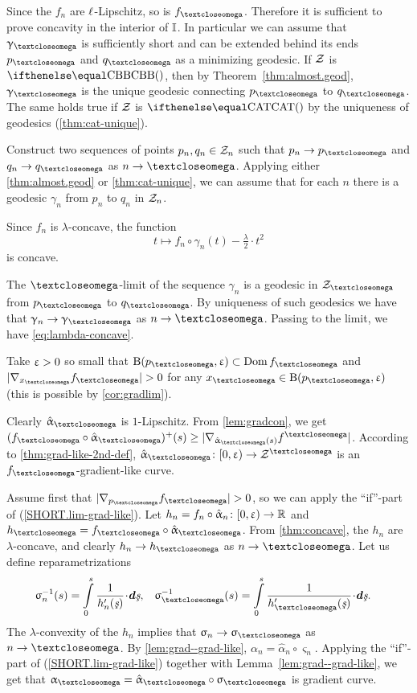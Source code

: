 Since the $f_n$ are ${\ell}$-Lipschitz, so is $f_\o$.
Therefore it is sufficient to prove concavity in the interior of $\mathbb{I}$.
In particular we can assume that $\gamma_\o$ is sufficiently short and can be extended behind its ends $p_\o$ and $q_\o$ as a minimizing geodesic.
If $\mathcal{Z}$ is $\Alex{}$, then by Theorem~\ref{thm:almost.geod}, $\gamma_\o$ is the unique geodesic connecting $p_\o$ to $q_\o$.
The same holds true if $\mathcal{Z}$ is $\CAT{}$ by the uniqueness of geodesics (\ref{thm:cat-unique}).

Construct two sequences of points $p_n,q_n\in\spc{Z}_n$ such that $p_n\to p_\o$ and $q_n\to q_\o$ as $n\to \o$.
Applying either \ref{thm:almost.geod} or \ref{thm:cat-unique},
we can assume that for each $n$ there is a geodesic $\gamma_n$ from $p_n$ to $q_n$ in $\mathcal{Z}_n$.

Since $f_n$ is $\lambda$-concave, the function 
\[t\mapsto f_n\circ\gamma_n(t)-\tfrac\lambda 2\cdot t^2\]
is concave.

The $\o$-limit of the sequence $\gamma_n$ is a geodesic in $\spc{Z}_\o$ from $p_\o$ to $q_\o$.
By uniqueness of such geodesics we have that $\gamma_n\to \gamma_\o$ as $n\to \o$.
Passing to the limit, we have \ref{eq:lambda-concave}.

Take $\upvarepsilon>0$ so small that $\oBall(p_\o,\eps)\subset\Dom f_\o$ and $|\nabla_{x_\o}f_\o|>0$ for any $x_\o\in\oBall(p_\o,\eps)$ (this is possible by \ref{cor:gradlim}).

Clearly $\hat\alpha_\o$ is $1$-Lipschitz.
From \ref{lem:gradcon}, we get 
$(f_\o\circ\hat\alpha_\o)^+(s)
\ge
|\nabla_{\hat\alpha_\o(s)}f^\o|$.
According to \ref{thm:grad-like-2nd-def}, $\hat\alpha_\o\:[0,\eps)\to \spc{Z}^\o$  is an $f_\o$-gradient-like curve.

Assume first that $|\nabla_{p_\o}f_\o|>0$, 
so we can apply the ``if''-part of (\ref{SHORT.lim-grad-like}).
Let $h_n=f_n\circ\hat\alpha_n\:[0,\eps)\to \RR$ 
and $h_\o=f_\o\circ\hat\alpha_\o$.
From \ref{thm:concave}, the $h_n$ are $\lambda$-concave, and clearly $h_n\to h_\o$ as $n\to\o$.
Let us define reparametrizations
\begin{align*}
{\varsigma_n^{-1}(s)}
&=
\int\limits_0^{s}\frac{1}{h_n'(\under s)}\cdot\dd\under s,
&
{\varsigma_\o^{-1}(s)}
&=
\int\limits_0^{s}\frac{1}{h_\o'(\under s)}\cdot\dd\under s.
\end{align*}
The $\lambda$-convexity of the $h_n$ implies that $\sigma_n\to\sigma_\o$ as $n\to\o$.
By \ref{lem:grad--grad-like}, 
$\alpha_n=\hat\alpha_n\circ\varsigma_n$.
Applying the ``if''-part of (\ref{SHORT.lim-grad-like}) together with Lemma~\ref{lem:grad--grad-like},
we get that $\alpha_\o=\hat\alpha_\o\circ\varsigma_\o$ is gradient curve.

